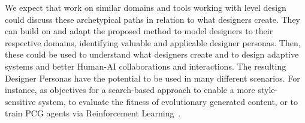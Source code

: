 

We expect that work on similar domains and tools working with level design could discuss these archetypical paths in relation to what designers create. They can build on and adapt the proposed method to model designers to their respective domains, identifying valuable and applicable designer personas. Then, these could be used to understand what designers create and to design adaptive systems and better Human-AI collaborations and interactions. The resulting Designer Personas have the potential to be used in many different scenarios. For instance, as objectives for a search-based approach to enable a more style-sensitive system, to evaluate the fitness of evolutionary generated content, or to train PCG agents via Reinforcement Learning~\cite{p10khalifa2020-pcgrl}.




